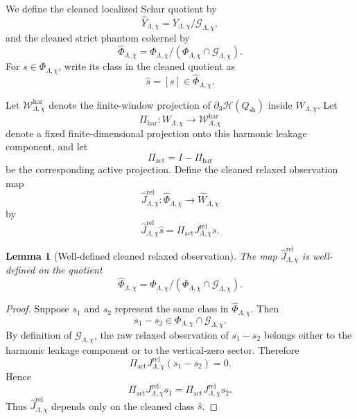\documentclass[11pt]{article}
\numberwithin{equation}{section}
\newtheorem{lemma}[theorem]{Lemma}
\begin{document}
We define the cleaned localized Schur quotient by
\[
        \widehat Y_{\Lambda,\chi}
        =Y_{\Lambda,\chi}/\mathcal G_{\Lambda,\chi},
\]
and the cleaned strict phantom cokernel by
\[
        \widehat\Phi_{\Lambda,\chi}
        =\Phi_{\Lambda,\chi}/(\Phi_{\Lambda,\chi}\cap\mathcal G_{\Lambda,\chi}).
\]
For \(s\in\Phi_{\Lambda,\chi}\), write its class in the cleaned quotient as
\[
        \widehat s=[s]\in\widehat\Phi_{\Lambda,\chi}.
\]

Let \(\mathcal W_{\Lambda,\chi}^{\mathrm{har}}\) denote the finite-window projection of \(\partial_3\mathcal H(Q_{\mathrm{sh}})\) inside \(W_{\Lambda,\chi}\).  Let
\[
        \Pi_{\mathrm{har}}:
        W_{\Lambda,\chi}\to
        \mathcal W_{\Lambda,\chi}^{\mathrm{har}}
\]
denote a fixed finite-dimensional projection onto this harmonic leakage component, and let
\[
        \Pi_{\mathrm{act}}=I-\Pi_{\mathrm{har}}
\]
be the corresponding active projection.  Define the cleaned relaxed observation map
\[
        \widehat J_{\Lambda,\chi}^{\mathrm{rel}}
        :\widehat\Phi_{\Lambda,\chi}\to
        \widehat W_{\Lambda,\chi}
\]
by
\[
        \widehat J_{\Lambda,\chi}^{\mathrm{rel}}\widehat s
        =\Pi_{\mathrm{act}}J_{\Lambda,\chi}^{\mathrm{rel}}s.
\]

\begin{lemma}[Well-defined cleaned relaxed observation]\label{lem:well-defined-cleaned-relaxed-observation}
The map \(\widehat J_{\Lambda,\chi}^{\mathrm{rel}}\) is well-defined on the quotient
\[
        \widehat\Phi_{\Lambda,\chi}
        =\Phi_{\Lambda,\chi}/(\Phi_{\Lambda,\chi}\cap\mathcal G_{\Lambda,\chi}).
\]
\end{lemma}

\begin{proof}
Suppose \(s_1\) and \(s_2\) represent the same class in \(\widehat\Phi_{\Lambda,\chi}\).  Then
\[
        s_1-s_2\in\Phi_{\Lambda,\chi}\cap\mathcal G_{\Lambda,\chi}.
\]
By definition of \(\mathcal G_{\Lambda,\chi}\), the raw relaxed observation of \(s_1-s_2\) belongs either to the harmonic leakage component or to the vertical-zero sector.  Therefore
\[
        \Pi_{\mathrm{act}}J_{\Lambda,\chi}^{\mathrm{rel}}(s_1-s_2)=0.
\]
Hence
\[
        \Pi_{\mathrm{act}}J_{\Lambda,\chi}^{\mathrm{rel}}s_1
        =
        \Pi_{\mathrm{act}}J_{\Lambda,\chi}^{\mathrm{rel}}s_2.
\]
Thus \(\widehat J_{\Lambda,\chi}^{\mathrm{rel}}\) depends only on the cleaned class \(\widehat s\).
\end{proof}
\end{document}
